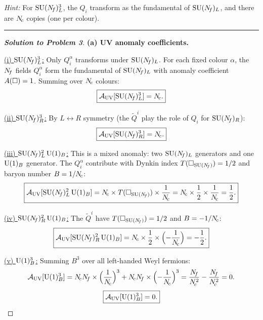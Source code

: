 \documentclass[11pt,a4paper]{article}
\begin{document}
\noindent\textit{Hint:} For $\mathrm{SU}(N_{\!f})_L^3$, the $Q_i$ transform as the
fundamental of $\mathrm{SU}(N_{\!f})_L$, and there are $N_{\!c}$ copies (one per colour).

\bigskip
\hrule
\bigskip

\begin{proof}[\textbf{Solution to Problem 3}]

\textbf{(a) UV anomaly coefficients.}

\underline{(i) $\mathrm{SU}(N_{\!f})_L^3$:}
Only $Q_i^\alpha$ transforms under $\mathrm{SU}(N_{\!f})_L$.  For each fixed colour
$\alpha$, the $N_{\!f}$ fields $Q_i^\alpha$ form the fundamental of $\mathrm{SU}(N_{\!f})_L$
with anomaly coefficient $A(\square) = 1$.  Summing over $N_{\!c}$ colours:
\begin{equation}
  \boxed{%
  \mathcal{A}_{\UV}[\SU{\Nf}_L^3] = \Nc.
  }
\end{equation}

\underline{(ii) $\mathrm{SU}(N_{\!f})_R^3$:}
By $L \leftrightarrow R$ symmetry (the $\widetilde{Q}^i$ play the role
of $Q_i$ for $\mathrm{SU}(N_{\!f})_R$):
\begin{equation}
  \boxed{%
  \mathcal{A}_{\UV}[\SU{\Nf}_R^3] = \Nc.
  }
\end{equation}

\underline{(iii) $\mathrm{SU}(N_{\!f})_L^2\,\mathrm{U}(1)_B$:}
This is a mixed anomaly: two $\mathrm{SU}(N_{\!f})_L$ generators and one $\mathrm{U}(1)_B$
generator.  The $Q_i^\alpha$ contribute with Dynkin index $T(\square_{\mathrm{SU}(N_{\!f})})
= 1/2$ and baryon number $B = 1/N_{\!c}$:
\begin{equation}
  \boxed{%
  \mathcal{A}_{\UV}[\SU{\Nf}_L^2\,\UU{1}_B]
  = \Nc \times T(\fund_{\SU{\Nf}}) \times \frac{1}{\Nc}
  = \Nc \times \frac{1}{2} \times \frac{1}{\Nc}
  = \frac{1}{2}.
  }
\end{equation}

\underline{(iv) $\mathrm{SU}(N_{\!f})_R^2\,\mathrm{U}(1)_B$:}
The $\widetilde{Q}^i$ have $T(\square_{\mathrm{SU}(N_{\!f})}) = 1/2$ and $B = -1/N_{\!c}$:
\begin{equation}
  \boxed{%
  \mathcal{A}_{\UV}[\SU{\Nf}_R^2\,\UU{1}_B]
  = \Nc \times \frac{1}{2} \times \Bigl(-\frac{1}{\Nc}\Bigr)
  = -\frac{1}{2}.
  }
\end{equation}

\underline{(v) $\mathrm{U}(1)_B^3$:}
Summing $B^3$ over all left-handed Weyl fermions:
\begin{equation}
  \mathcal{A}_{\UV}[\UU{1}_B^3]
  = \Nc\Nf \times \Bigl(\frac{1}{\Nc}\Bigr)^3
  + \Nc\Nf \times \Bigl(-\frac{1}{\Nc}\Bigr)^3
  = \frac{\Nf}{\Nc^2} - \frac{\Nf}{\Nc^2}
  = 0.
\end{equation}
\begin{equation}
  \boxed{%
  \mathcal{A}_{\UV}[\UU{1}_B^3] = 0.
  }
\end{equation}


\end{proof}
\end{document}
